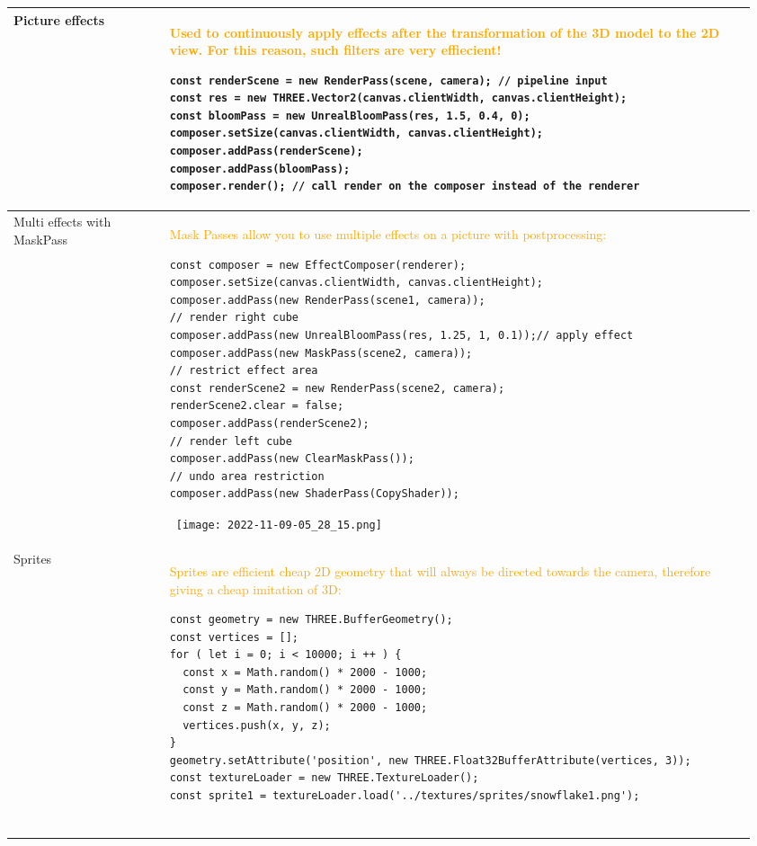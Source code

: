 \documentclass[main.tex,fontsize=8pt,paper=a4,paper=portrait,DIV=calc,]{scrartcl}
\begin{document}
\begin{table}[ht!]
\begin{tabular}{|m{0.2\linewidth}|m{0.755\linewidth}|}
\hline
Picture effects & 
\textcolor{orange}{Used to continuously apply effects after the transformation of the 3D model to the 2D view.\newline
For this reason, such filters are very effiecient!}\newline
\begin{lstlisting}
const renderScene = new RenderPass(scene, camera); // pipeline input
const res = new THREE.Vector2(canvas.clientWidth, canvas.clientHeight);
const bloomPass = new UnrealBloomPass(res, 1.5, 0.4, 0);
composer.setSize(canvas.clientWidth, canvas.clientHeight);
composer.addPass(renderScene);
composer.addPass(bloomPass);
composer.render(); // call render on the composer instead of the renderer
\end{lstlisting}\\
\hline
Multi effects with MaskPass & 
\textcolor{orange}{Mask Passes allow you to use multiple effects on a picture with postprocessing:}\newline
\begin{lstlisting}
const composer = new EffectComposer(renderer);
composer.setSize(canvas.clientWidth, canvas.clientHeight);
composer.addPass(new RenderPass(scene1, camera));
// render right cube
composer.addPass(new UnrealBloomPass(res, 1.25, 1, 0.1));// apply effect
composer.addPass(new MaskPass(scene2, camera));
// restrict effect area
const renderScene2 = new RenderPass(scene2, camera);
renderScene2.clear = false;
composer.addPass(renderScene2);
// render left cube
composer.addPass(new ClearMaskPass());
// undo area restriction
composer.addPass(new ShaderPass(CopyShader));
\end{lstlisting}
\, \newline
\texttt{[image: 2022-11-09-05\_28\_15.png]}\\
\hline
Sprites & 
\textcolor{orange}{Sprites are efficient cheap 2D geometry that will always be directed towards the camera, therefore giving a cheap imitation of 3D:}\newline
\begin{lstlisting}
const geometry = new THREE.BufferGeometry();
const vertices = [];
for ( let i = 0; i < 10000; i ++ ) {
  const x = Math.random() * 2000 - 1000;
  const y = Math.random() * 2000 - 1000;
  const z = Math.random() * 2000 - 1000;
  vertices.push(x, y, z);
}
geometry.setAttribute('position', new THREE.Float32BufferAttribute(vertices, 3));
const textureLoader = new THREE.TextureLoader();
const sprite1 = textureLoader.load('../textures/sprites/snowflake1.png');


\end{lstlisting}
\end{tabular}
\end{table}
\end{document}

